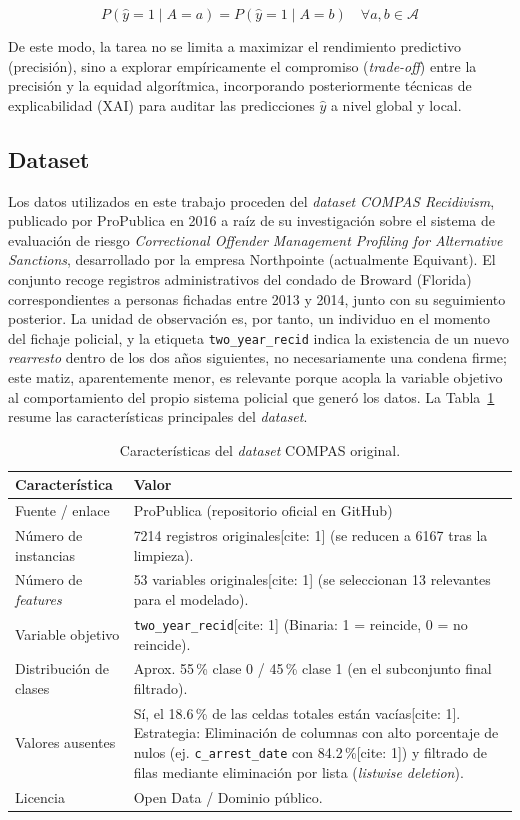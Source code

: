 \documentclass[11pt,a4paper]{article}
\begin{document}
$$ P(\hat{y} = 1 \mid A = a) = P(\hat{y} = 1 \mid A = b) \quad \forall a, b \in \mathcal{A} $$

De este modo, la tarea no se limita a maximizar el rendimiento predictivo (precisión), sino a explorar empíricamente el compromiso (\textit{trade-off}) entre la precisión y la equidad algorítmica, incorporando posteriormente técnicas de explicabilidad (XAI) para auditar las predicciones $\hat{y}$ a nivel global y local.

\subsection{Dataset}

Los datos utilizados en este trabajo proceden del \textit{dataset} \textit{COMPAS Recidivism}, publicado por ProPublica en 2016 a raíz de su investigación sobre el sistema de evaluación de riesgo \textit{Correctional Offender Management Profiling for Alternative Sanctions}, desarrollado por la empresa Northpointe (actualmente Equivant). El conjunto recoge registros administrativos del condado de Broward (Florida) correspondientes a personas fichadas entre 2013 y 2014, junto con su seguimiento posterior. La unidad de observación es, por tanto, un individuo en el momento del fichaje policial, y la etiqueta \texttt{two\_year\_recid} indica la existencia de un nuevo \emph{rearresto} dentro de los dos años siguientes, no necesariamente una condena firme; este matiz, aparentemente menor, es relevante porque acopla la variable objetivo al comportamiento del propio sistema policial que generó los datos. La Tabla~\ref{tab:dataset} resume las características principales del \textit{dataset}.

\begin{table}[H]
\centering
\caption{Características del \textit{dataset} COMPAS original.}
\label{tab:dataset}
\small
\begin{tabular}{@{}lp{10cm}@{}}
\toprule
\textbf{Característica} & \textbf{Valor} \\
\midrule
Fuente / enlace           & ProPublica (repositorio oficial en GitHub) \\
Número de instancias      & 7214 registros originales[cite: 1] (se reducen a 6167 tras la limpieza). \\
Número de \textit{features} & 53 variables originales[cite: 1] (se seleccionan 13 relevantes para el modelado). \\
Variable objetivo         & \texttt{two\_year\_recid}[cite: 1] (Binaria: 1 = reincide, 0 = no reincide). \\
Distribución de clases & Aprox. 55\,\% clase 0 / 45\,\% clase 1 (en el subconjunto final filtrado). \\
Valores ausentes          & Sí, el 18.6\,\% de las celdas totales están vacías[cite: 1]. Estrategia: Eliminación de columnas con alto porcentaje de nulos (ej. \texttt{c\_arrest\_date} con 84.2\,\%[cite: 1]) y filtrado de filas mediante eliminación por lista (\textit{listwise deletion}). \\
Licencia                  & Open Data / Dominio público. \\
\bottomrule
\end{tabular}
\end{table}
\end{document}
